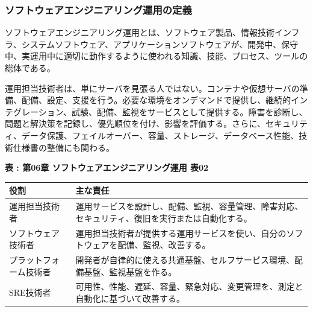 \subsubsection{ソフトウェアエンジニアリング運用の定義}

ソフトウェアエンジニアリング運用とは、ソフトウェア製品、情報技術インフラ、システムソフトウェア、アプリケーションソフトウェアが、開発中、保守中、実運用中に適切に動作するように使われる知識、技能、プロセス、ツールの総体である。

運用担当技術者は、単にサーバを見張る人ではない。コンテナや仮想サーバの準備、配備、設定、支援を行う。必要な環境をオンデマンドで提供し、継続的インテグレーション、試験、配備、監視をサービスとして提供する。障害を診断し、問題と解決策を記録し、優先順位を付け、影響を評価する。さらに、セキュリティ、データ保護、フェイルオーバー、容量、ストレージ、データベース性能、技術仕様書の整備にも関わる。

\par\smallskip\noindent{}\label{tab:ch06-02}\textbf{表 \thetable: 第06章 ソフトウェアエンジニアリング運用 表02}\par\smallskip
\begin{longtable}{L{45mm}L{105mm}}
\toprule
役割 & 主な責任 \\
\midrule
運用担当技術者 & 運用サービスを設計し、配備、監視、容量管理、障害対応、セキュリティ、復旧を実行または自動化する。 \\
ソフトウェア技術者 & 運用担当技術者が提供する運用サービスを使い、自分のソフトウェアを配備、監視、改善する。 \\
プラットフォーム技術者 & 開発者が自律的に使える共通基盤、セルフサービス環境、配備基盤、監視基盤を作る。 \\
SRE技術者 & 可用性、性能、遅延、容量、緊急対応、変更管理を、測定と自動化に基づいて改善する。 \\
\bottomrule
\end{longtable}
